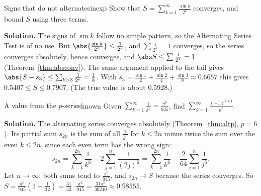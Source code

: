 \documentclass[11pt]{article}
\begin{document}
\begin{exmp}{Signs that do not alternate}{sinexp}
Show that $S=\displaystyle\sum_{k=1}^\infty\frac{\sin k}{2^k}$ converges, and bound $S$ using three terms.

\textbf{Solution.} The signs of $\sin k$ follow no simple pattern, so the Alternating Series Test is of no use. But $\abs{\frac{\sin k}{2^k}}\le\frac1{2^k}$, and $\sum\frac1{2^k}=1$ converges, so the series converges absolutely, hence converges, and $\abs S\le\sum\frac1{2^k}=1$ (Theorem~\ref{thm:absconv}). The same argument applied to the tail gives $\abs{S-s_3}\le\sum_{k>3}\frac1{2^k}=\frac18$. With $s_3=\frac{\sin1}2+\frac{\sin2}4+\frac{\sin3}8\approx0.6657$ this gives $0.5407\le S\le0.7907$. (The true value is about $0.5928$.)
\end{exmp}

\begin{exmp}{A value from the $p$-series}{known}
Given $\displaystyle\sum_{k=1}^\infty\frac1{k^6}=\frac{\pi^6}{945}$, find $\displaystyle\sum_{k=1}^\infty\frac{(-1)^{k+1}}{k^6}$.

\textbf{Solution.} The alternating series converges absolutely (Theorem~\ref{thm:altp}, $p=6$). Its partial sum $s_{2n}$ is the sum of all $\frac1{k^6}$ for $k\le2n$ minus twice the sum over the even $k\le2n$, since each even term has the wrong sign:
\[
s_{2n}=\sum_{k=1}^{2n}\frac1{k^6}-2\sum_{j=1}^n\frac1{(2j)^6}=\sum_{k=1}^{2n}\frac1{k^6}-\frac2{64}\sum_{j=1}^n\frac1{j^6}.
\]
Let $n\to\infty$: both sums tend to $\frac{\pi^6}{945}$, and $s_{2n}\to S$ because the series converges. So $S=\frac{\pi^6}{945}\left(1-\frac1{32}\right)=\frac{31}{32}\cdot\frac{\pi^6}{945}=\frac{31\pi^6}{30240}\approx0.98555$.
\end{exmp}
\end{document}
